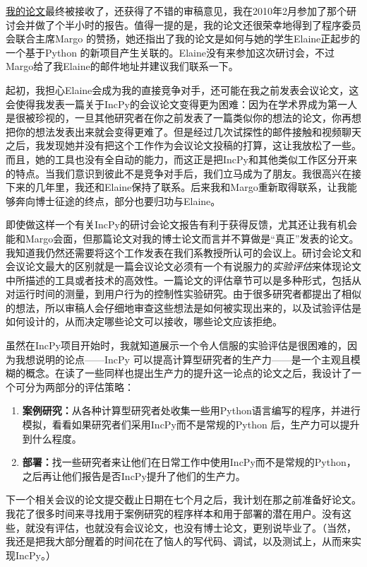 \documentclass[letter,12pt]{book}
\begin{document}
\begin{CJK}{UTF8}{gbsn}
\href{http://www.pgbovine.net/projects/pubs/guo_tapp10_camera_ready.pdf}{我的论文}最终被接收了，还获得了不错的审稿意见，我在2010年2月参加了那个研讨会并做了个半小时的报告。值得一提的是，我的论文还很荣幸地得到了程序委员会联合主席Margo 的赞扬，她还指出了我的论文是如何与她的学生Elaine正起步的一个基于Python 的新项目产生关联的。Elaine没有来参加这次研讨会，不过Margo给了我Elaine的邮件地址并建议我们联系一下。

起初，我担心Elaine会成为我的直接竞争对手，还可能在我之前发表会议论文，这会使得我发表一篇关于IncPy的会议论文变得更为困难：因为在学术界成为第一人是很被珍视的，一旦其他研究者在你之前发表了一篇类似你的想法的论文，你再想把你的想法发表出来就会变得更难了。但是经过几次试探性的邮件接触和视频聊天之后，我发现她并没有把这个工作作为会议论文投稿的打算，这让我放松了一些。而且，她的工具也没有全自动的能力，而这正是把IncPy和其他类似工作区分开来的特点。当我们意识到彼此不是竞争对手后，我们立马成为了朋友。我很高兴在接下来的几年里，我还和Elaine保持了联系。后来我和Margo重新取得联系，让我能够奔向博士征途的终点，部分也要归功与Elaine。

\breakline

即使做这样一个有关IncPy的研讨会论文报告有利于获得反馈，尤其还让我有机会能和Margo会面，但那篇论文对我的博士论文而言并不算做是“真正”发表的论文。我知道我仍然还需要将这个工作发表在我们系教授所认可的会议上。研讨会论文和会议论文最大的区别就是一篇会议论文必须有一个有说服力的\emph{实验评估}来体现论文中所描述的工具或者技术的高效性。一篇论文的评估章节可以是多种形式，包括从对运行时间的测量，到用户行为的控制性实验研究。由于很多研究者都提出了相似的想法，所以审稿人会仔细地审查这些想法是如何被实现出来的，以及试验评估是如何设计的，从而决定哪些论文可以接收，哪些论文应该拒绝。

虽然在IncPy项目开始时，我就知道展示一个令人信服的实验评估是很困难的，因为我想说明的论点——IncPy 可以提高计算型研究者的生产力——是一个主观且模糊的概念。在读了一些同样也提出生产力的提升这一论点的论文之后，我设计了一个可分为两部分的评估策略：
\begin{enumerate}
  \item \textbf{案例研究：}从各种计算型研究者处收集一些用Python语言编写的程序，并进行模拟，看看如果研究者们采用IncPy而不是常规的Python 后，生产力可以提升到什么程度。
  \item \textbf{部署：}找一些研究者来让他们在日常工作中使用IncPy而不是常规的Python，之后再让他们报告是否IncPy提升了他们的生产力。
\end{enumerate}
下一个相关会议的论文提交截止日期在七个月之后，我计划在那之前准备好论文。我花了很多时间来寻找用于案例研究的程序样本和用于部署的潜在用户。没有这些，就没有评估，也就没有会议论文，也没有博士论文，更别说毕业了。（当然，我还是把我大部分醒着的时间花在了恼人的写代码、调试，以及测试上，从而来实现IncPy。）


\end{CJK}
\end{document}
